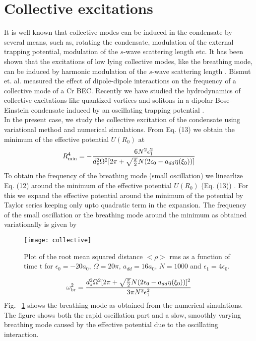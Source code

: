 \documentclass[amsmath,amssymb,article,twocolumn,superscriptaddress,showpacs,10pt]{revtex4-1}
\begin{document}
\section{Collective excitations} \label{sec5}
It is well known that collective modes can be induced in the condensate by several means, such as, rotating the condensate, modulation of the external trapping potential, modulation of the $s$-wave  scattering length etc. It has been shown that the excitations of low lying collective modes, like the breathing mode, can be induced by harmonic modulation of the $s$-wave  scattering length \cite{Vidanovic:2011,Saito:2003}. Bismut et. al.  \cite{Bismut:2010} measured the effect of dipole-dipole interactions on the frequency of a collective mode of a Cr BEC. Recently we have studied the
hydrodynamics of collective excitations like quantized vortices and solitons in a dipolar Bose-Einstein condensate induced by an oscillating trapping potential \cite{Sabari:2017}.\\
In the present case, we study the collective excitation of the condensate using variational method and numerical simulations.  From Eq. (13)  we obtain the minimum of the effective potential $U(R_0)$ at
\begin{equation}
R^4_{{\rm min}} = -\frac{6N^2\epsilon_1^2}{d_z^2\Omega^2[2\pi + 
{\sqrt \frac{\pi}{2}}N(2\epsilon_0  -  a_{dd}\eta(\xi_0))]}
\end{equation}
To obtain the frequency of the breathing mode (small oscillation) we linearlize Eq. (12) around the minimum of the effective potential $U(R_0)$ (Eq. (13)) \cite{Saito:2003}. For this we expand the effective potential around the minimum of the potential by Taylor series keeping only upto quadratic term in the expansion. The frequency of the small oscillation or the breathing mode around the minimum  as obtained variationally is given by  
\begin{figure}[h!]
\begin{center}
\texttt{[image: collective]}
\end{center}
\caption{Plot of the root mean squared distance $<\rho>$ rms as a function of time t for $\epsilon_0=-20a_0$, $\Omega=20\pi$, $a_{dd}=16 a_0$, $N=1000$ and $\epsilon_1=4\epsilon_0$.}
\label{fig:brfreq}
\end{figure}
\begin{equation}
\omega_{\rm br}^2 = \frac{d_z^2\Omega^2[2\pi + {\sqrt \frac{\pi}{2}}N(2\epsilon_0 - a_{dd}\eta(\xi_0))]^2}
{3\pi  N^2\epsilon_1^2}
\end{equation}
Fig. ~\ref{fig:brfreq} shows the breathing mode as obtained from the numerical simulations. The figure shows both the rapid oscillation part and a slow, smoothly varying breathing mode caused by the effective potential due to the oscillating interaction.
%
\end{document}

